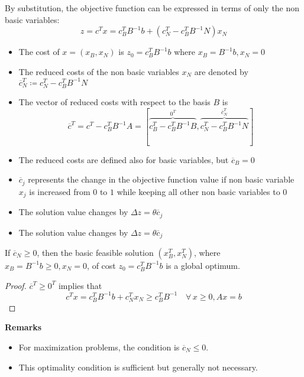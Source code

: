 \documentclass[english]{article}
\begin{document}
By substitution, the objective function can be expressed in terms of only the non basic variables:
\[ z = c^T x = c_B^T B^{-1} b + \left( c_N^T - c_B^T B^{-1} N \right) x_N  \]

\begin{itemize}
  \item The cost of \(x = (x_B, x_N)\) is \(z_0 = c_B^T B^{-1} b\) where \(x_B = B^{-1} b, x_N = 0\)
  \item The reduced costs of the non basic variables \(x_N\) are denoted by \(\overline{c}_N^T \coloneqq c_N^T - c_B^T B^{-1} N\)
  \item The vector of reduced costs with respect to the basis \(B\) is
        \[ \overline{c}^T = c^T - c_B^T B^{-1} A = [\overbrace{c_B^T - c_B^T B^{-1} B}^{0^T}, \overbrace{c_N^T - c_B^T B^{-1}N}^{\overline{c}_N^T}] \]
\end{itemize}

\bigskip
\begin{itemize}
  \item The reduced costs are defined also for basic variables, but \(\overline{c}_B = 0\)
  \item \(\overline{c}_j\) represents the change in the objective function value if non basic variable \(x_j\) is increased from \(0\) to \(1\) while keeping all other non basic variables to \(0\)
  \item The solution value changes by \(\Delta z = \theta \overline{c}_j\)  \item The solution value changes by \(\Delta z = \theta \overline{c}_j\)

\end{itemize}

\bigskip
\begin{proposition}
  If \(\overline{c}_N \geq 0\), then the basic feasible solution \(\left( x_B^T, x_N^T \right)\), where \(x_B = B^{-1} b \geq 0, x_N = 0\), of cost \(z_0 = c_B^T B^{-1} b\) is a global optimum.
\end{proposition}

\begin{proof}
  \(\overline{c}^T \geq 0^T\) implies that
  \[ c^T x = c_B^T B^{-1} b + c_N^T x_N \geq c_B^T B^{-1} \quad \forall \, x \geq 0, Ax = b \]
\end{proof}

\bigskip
\textbf{Remarks}
\begin{itemize}
  \item For maximization problems, the condition is \(\overline{c}_N \leq 0\).
  \item This optimality condition is sufficient but generally not necessary.
\end{itemize}
\end{document}
